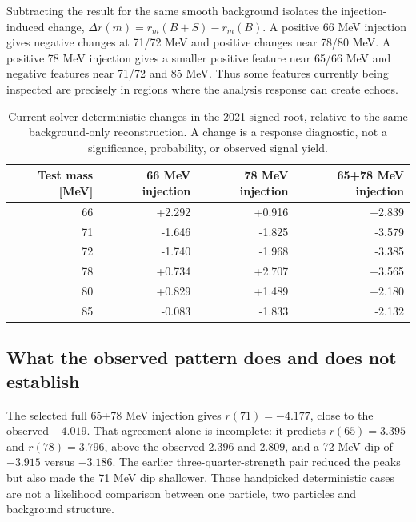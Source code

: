 Subtracting the result for the same smooth background isolates the injection-induced change, $\Delta r(m)=r_m(B+S)-r_m(B)$. A positive 66 MeV injection gives negative changes at 71/72 MeV and positive changes near 78/80 MeV. A positive 78 MeV injection gives a smaller positive feature near 65/66 MeV and negative features near 71/72 and 85 MeV. Thus some features currently being inspected are precisely in regions where the analysis response can create echoes.
\begin{table}[H]\centering\small
\begin{tabular}{rrrr}\toprule
Test mass [MeV] & 66 MeV injection & 78 MeV injection & 65+78 MeV injection\\\midrule
66 & +2.292 & +0.916 & +2.839\\
71 & -1.646 & -1.825 & -3.579\\
72 & -1.740 & -1.968 & -3.385\\
78 & +0.734 & +2.707 & +3.565\\
80 & +0.829 & +1.489 & +2.180\\
85 & -0.083 & -1.833 & -2.132\\
\bottomrule\end{tabular}
\caption{Current-solver deterministic changes in the 2021 signed root, relative to the same background-only reconstruction. A change is a response diagnostic, not a significance, probability, or observed signal yield.}\end{table}

\clearpage
{}

\clearpage
\subsection*{What the observed pattern does and does not establish}
The selected full 65+78 MeV injection gives $r(71)=-4.177$, close to the observed $-4.019$. That agreement alone is incomplete: it predicts $r(65)=3.395$ and $r(78)=3.796$, above the observed $2.396$ and $2.809$, and a 72 MeV dip of $-3.915$ versus $-3.186$. The earlier three-quarter-strength pair reduced the peaks but also made the 71 MeV dip shallower. Those handpicked deterministic cases are not a likelihood comparison between one particle, two particles and background structure.

